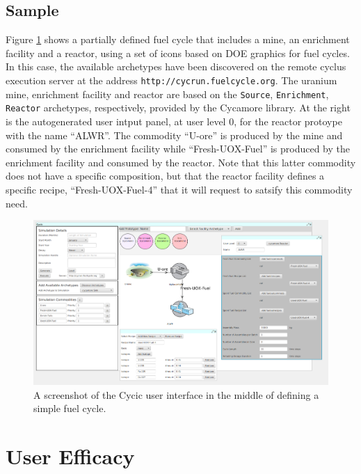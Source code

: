 \subsection{Sample}

Figure \ref{fig:cycic-sample} shows a partially defined fuel cycle that
includes a mine, an enrichment facility and a reactor, using a set of icons
based on DOE graphics for fuel cycles.  In this case, the
available archetypes have been discovered on the remote cyclus execution
server at the address \texttt{http://cycrun.fuelcycle.org}. The uranium mine,
enrichment facility and reactor are based on the \texttt{Source},
\texttt{Enrichment}, \texttt{Reactor} archetypes, respectively, provided by
the Cycamore library.  At the right is the autogenerated user intput panel, at
user level 0, for the reactor protoype with the name ``ALWR''.  The commodity
``U-ore'' is produced by the mine and consumed by the enrichment facility
while ``Fresh-UOX-Fuel'' is produced by the enrichment facility and consumed
by the reactor.  Note that this latter commodity does not have a specific
composition, but that the reactor facility defines a specific recipe,
``Fresh-UOX-Fuel-4'' that it will request to satsify this commodity need.

\begin{figure}[htbp]
\begin{center}
\includegraphics[width=\columnwidth]{./images/cycic-sample}
\caption{A screenshot of the Cycic user interface in the middle of defining a simple fuel cycle.}
\end{center}
\label{fig:cycic-sample}
\end{figure}

\section{User Efficacy}

